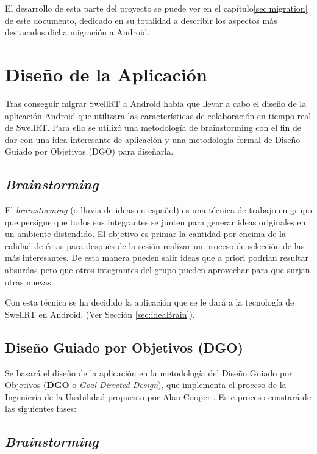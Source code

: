 El desarrollo de esta parte del proyecto se puede ver en el capítulo\ref{sec:migration} de este documento, dedicado en su totalidad a describir los aspectos más destacados dicha migración a Android. 

\section{Diseño de la Aplicación}

	Tras conseguir migrar SwellRT a Android había que llevar a cabo el diseño de la aplicación Android que utilizara las características de colaboración en tiempo real de SwellRT. Para ello se utilizó una metodología de brainstorming con el fin de dar con una idea interesante de aplicación y una metodología formal de Diseño Guiado por Objetivos (DGO) para diseñarla.

  \subsection{\textit{Brainstorming}}
  
  El \textit{brainstorming} \cite{ref:bookBrainStorming} (o lluvia de ideas en español) es una técnica de trabajo en grupo que persigue que todos sus integrantes se junten para generar ideas originales en un ambiente distendido. El objetivo es primar la cantidad por encima de la calidad de éstas para después de la sesión realizar un proceso de selección de las más interesantes. De esta manera pueden salir ideas que a priori podrian resultar absurdas pero que otros integrantes del grupo pueden aprovechar para que surjan otras nuevas. 
  
  Con esta técnica se ha decidido la aplicación que se le dará a la tecnología de SwellRT en Android. (Ver Sección \ref{sec:ideaBrain}).
  
  \subsection{Diseño Guiado por Objetivos (DGO)}\label{ssec:dgoDesign}
  
  Se basará el diseño de la aplicación en la metodología del Diseño Guiado por Objetivos (\textbf{DGO} o \textit{Goal-Directed Design}), que implementa el proceso de la Ingeniería de la Usabilidad propuesto por Alan Cooper \cite{ref:bookAlanCooper}. Este proceso constará de las siguientes fases:

  \subsection{\textit{Brainstorming}}
  
